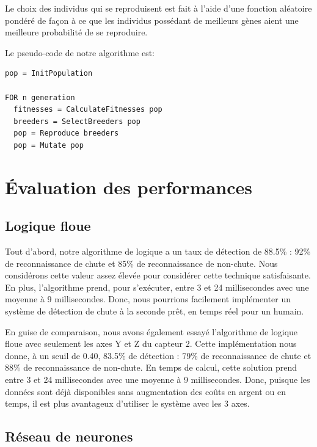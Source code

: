 \documentclass[12pt,letterpaper]{article}
\begin{document}
Le choix des individus qui se reproduisent est fait à l'aide d'une fonction aléatoire pondéré de façon à ce que les individus possédant
de meilleurs gènes aient une meilleure probabilité de se reproduire.

Le pseudo-code de notre algorithme est:

\begin{verbatim}
pop = InitPopulation

FOR n generation
  fitnesses = CalculateFitnesses pop
  breeders = SelectBreeders pop
  pop = Reproduce breeders
  pop = Mutate pop

\end{verbatim}


\section{Évaluation des performances}

\subsection{Logique floue}

Tout d'abord, notre algorithme de logique a un taux de détection de 88.5\% : 92\% de reconnaissance de chute et 85\% de reconnaissance de non-chute. Nous considérons cette valeur assez élevée pour considérer cette technique satisfaisante. En plus, l'algorithme prend, pour s'exécuter, entre 3 et 24 millisecondes avec une moyenne à 9 millisecondes. Donc, nous pourrions facilement implémenter un système de détection de chute à la seconde prêt, en temps réel pour un humain.

En guise de comparaison, nous avons également essayé l'algorithme de logique floue avec seulement les axes Y et Z du capteur 2. Cette implémentation nous donne, à un seuil de 0.40, 83.5\% de détection : 79\% de reconnaissance de chute et 88\% de reconnaissance de non-chute. En temps de calcul, cette solution prend entre 3 et 24 millisecondes avec une moyenne à 9 millisecondes. Donc, puisque les données sont déjà disponibles sans augmentation des coûts en argent ou en temps, il est plus avantageux d'utiliser le système avec les 3 axes.

\subsection{Réseau de neurones} %
\end{document}
